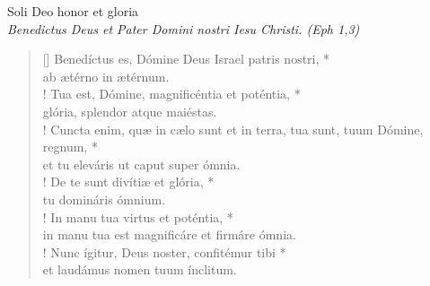 


\def\greinitialformat#1{%
{\fontsize{39}{39}\selectfont #1}%
}




\vspace{0.3cm}
\begin{center}

Soli Deo honor et gloria\\
\textit{\small Benedictus Deus et Pater Domini nostri Iesu Christi. (Eph 1,3)}
\end{center}
\begin{verse}[\versewidth]
Benedíctus es, Dómine Deus Israel patris nostri, *\\
ab ætérno in ætérnum.\\!
\vin Tua est, Dómine, magnificéntia et poténtia, *\\
\vin glória, splendor atque maiéstas.\\!
Cuncta enim, quæ in cælo sunt et in terra, tua sunt, tuum Dómine, regnum, *\\
et tu eleváris ut caput super ómnia.\\!
\vin De te sunt divítiæ et glória, *\\
\vin tu domináris ómnium.\\!
In manu tua virtus et poténtia, *\\
in manu tua est magnificáre et firmáre ómnia.\\!
\vin Nunc ígitur, Deus noster, confitémur tibi *\\
\vin et laudámus nomen tuum ínclitum.\\
\end{verse}
\vspace{1cm}


